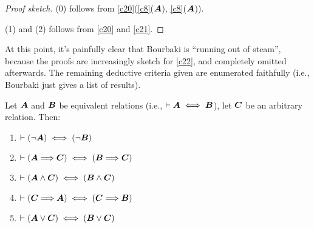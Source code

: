 \begin{proof}[Proof sketch]
(0) follows from \ref{c20}(\ref{c8}($\boldsymbol{A}$), \ref{c8}($\boldsymbol{A}$)).

(1) and (2) follows from \ref{c20} and \ref{c21}.
\end{proof}

At this point, it's painfully clear that Bourbaki is ``running out of steam'',
because the proofs are increasingly sketch for \ref{c22}, and completely
omitted afterwards. The remaining deductive criteria given are
enumerated faithfully (i.e., Bourbaki just gives a list of results).

\begin{dc}\label{c23}%
Let $\boldsymbol{A}$ and $\boldsymbol{B}$ be equivalent relations
(i.e., $\vdash\boldsymbol{A}\iff\boldsymbol{B}$), let
$\boldsymbol{C}$ be an arbitrary relation. Then:
\begin{enumerate}
\item $\vdash(\neg\boldsymbol{A})\iff(\neg\boldsymbol{B})$
\item $\vdash(\boldsymbol{A}\Longrightarrow\boldsymbol{C})\iff(\boldsymbol{B}\Longrightarrow\boldsymbol{C})$
\item $\vdash(\boldsymbol{A}\land\boldsymbol{C})\iff(\boldsymbol{B}\land\boldsymbol{C})$
\item $\vdash(\boldsymbol{C}\Longrightarrow\boldsymbol{A})\iff(\boldsymbol{C}\Longrightarrow\boldsymbol{B})$
\item $\vdash(\boldsymbol{A}\lor\boldsymbol{C})\iff(\boldsymbol{B}\lor\boldsymbol{C})$
\end{enumerate}
\end{dc}

